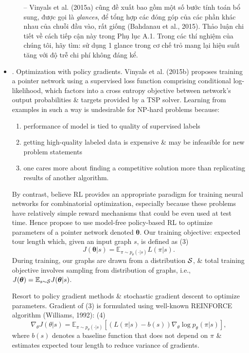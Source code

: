 \documentclass{article}
\begin{document}
\begin{itemize}
\begin{itemize}
        -- Vinyals et al. (2015a) cũng đề xuất bao gồm một số bước tính toán bổ sung, được gọi là {\it glances}, để tổng hợp các đóng góp của các phần khác nhau của chuỗi đầu vào, rất giống (Bahdanau et al., 2015). Thảo luận chi tiết về cách tiếp cận này trong Phụ lục A.1. Trong các thí nghiệm của chúng tôi, hãy tìm: sử dụng 1 glance trong cơ chế trỏ mang lại hiệu suất tăng với độ trễ chi phí không đáng kể.
    \end{itemize}
    \item {. Optimization with policy gradients.} Vinyals et al. (2015b) proposes training a pointer network using a supervised loss function comprising conditional log-likelihood, which factors into a cross entropy objective between network's output probabilities \& targets provided by a TSP solver. Learning from examples in such a way is undesirable for NP-hard problems because:
    \begin{enumerate}
        \item performance of model is tied to quality of supervised labels
        \item getting high-quality labeled data is expensive \& may be infeasible for new problem statements
        \item one cares more about finding a competitive solution more than replicating results of another algorithm.
    \end{enumerate}
    By contrast, believe RL provides an appropriate paradigm for training neural networks for combinatorial optimization, especially because these problems have relatively simple reward mechanisms that could be even used at test time. Hence propose to use model-free policy-based RL to optimize parameters of a pointer network denoted $\boldsymbol{\theta}$. Our training objective: expected tour length which, given an input graph $s$, is defined as (3)
    \begin{equation*}
        J(\boldsymbol{\theta}|s) = \mathbb{E}_{\pi\sim p_\theta(\cdot|s)} L(\pi|s).
    \end{equation*}
    During training, our graphs are drawn from a distribution ${\cal S}$, \& total training objective involves sampling from distribution of graphs, i.e., $J(\boldsymbol{\theta}) = \mathbb{E}_{s\sim{\cal S}} J(\boldsymbol{\theta}|s)$.
    
    Resort to policy gradient methods \& stochastic gradient descent to optimize parameters. Gradient of (3) is formulated using well-known REINFORCE algorithm (Williams, 1992): (4)
    \begin{equation*}
        \nabla_\theta J(\theta|s) = \mathbb{E}_{\pi\sim p_\theta(\cdot|s)}\left[(L(\pi|s) - b(s))\nabla_\theta\log p_\theta(\pi|s)\right],
    \end{equation*}
    where $b(s)$ denotes a baseline function that does not depend on $\pi$ \& estimates expected tour length to reduce variance of gradients.
    

\end{itemize}
\end{document}
